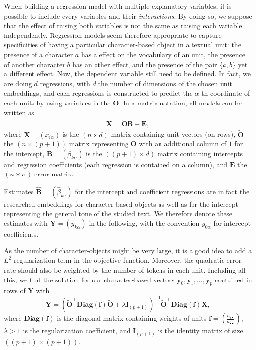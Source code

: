 \documentclass[
twocolumn,
]{ceurart}
\begin{document}
When building a regression model with multiple explanatory variables, it is possible to include every variables and their \emph{interactions}. By doing so, we suppose that the effect of raising both variables is not the same as raising each variable independently. Regression models seem therefore appropriate to capture specificities of having a particular character-based object in a textual unit: the presence of a character $a$ has a effect on the vocabulary of an unit, the presence of another character $b$ has an other effect, and the presence of the pair $\{a, b\}$ yet a different effect. Now, the dependent variable still need to be defined. In fact, we are doing $d$ regressions, with $d$ the number of dimensions of the chosen unit embeddings, and each regressions is constructed to predict the $\alpha$-th coordinate of each units by using variables in the $\mathbf{O}$. In a matrix notation, all models can be written as
\begin{align}
\mathbf{X} = \widetilde{\mathbf{O}} \mathbf{B} + \mathbf{E}, \label{cent_sol}
\end{align}
where $\mathbf{X} = (x_{i\alpha})$ is the $(n \times d)$ matrix containing unit-vectors (on rows), $\widetilde{\mathbf{O}}$ the $(n \times (p+1))$ matrix representing $\mathbf{O}$ with an additional column of $1$ for the intercept, $\mathbf{B} = (\beta_{k\alpha})$ is the $((p+1) \times d)$ matrix containing intercepts and regression coefficients (each regression is contained on a column), and $\mathbf{E}$ the $(n \times \alpha)$ error matrix. 

Estimates $\widehat{\mathbf{B}} = (\widehat{\beta}_{k\alpha})$ for the intercept and coefficient regressions are in fact the researched embeddings for character-based objects as well as for the intercept representing the general tone of the studied text. We therefore denote these estimates with $\mathbf{Y} = (y_{k\alpha})$ in the following, with the convention $y_{0\alpha}$ for intercept coefficients. 

As the number of character-objects might be very large, it is a good idea to add a $L^2$ regularization term in the objective function. Moreover, the quadratic error rate should also be weighted by the number of tokens in each unit. Including all this, we find the solution for our character-based vectors $\mathbf{y}_0, \mathbf{y}_1, \ldots, \mathbf{y}_p$ contained in rows of $\mathbf{Y}$ with 
\begin{equation}
\mathbf{Y} = (\widetilde{\mathbf{O}}^\top \textbf{Diag}(\mathbf{f}) \widetilde{\mathbf{O}} + \lambda \mathbf{I}_{(p+1)})^{-1} \widetilde{\mathbf{O}}^\top \textbf{Diag}(\mathbf{f}) \mathbf{X}, \label{reg_sol}
\end{equation}
where $\textbf{Diag}(\mathbf{f})$ is the diagonal matrix containing weights of units $\mathbf{f} = \left( \frac{n_{i \bullet}}{n_{\bullet \bullet}} \right)$, $\lambda > 1$ is the regularization coefficient, and $\mathbf{I}_{(p+1)}$ is the identity matrix of size $((p+1) \times (p+1))$.
\end{document}
